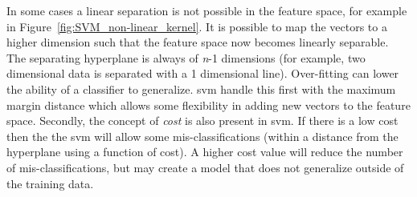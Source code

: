 In some cases a linear separation is not possible in the feature space, for example in Figure~\ref{fig:SVM_non-linear_kernel}. It is possible to map the vectors to a higher dimension such that the feature space now becomes linearly separable. The separating hyperplane is always of \emph{n}-1 dimensions (for example, two dimensional data is separated with a 1 dimensional line). Over-fitting can lower the ability of a classifier to generalize. \gls{svm} handle this first with the maximum margin distance which allows some flexibility in adding new vectors to the feature space. Secondly, the concept of \emph{cost} is also present in \gls{svm}. If there is a low cost then the the \gls{svm} will allow some mis-classifications (within a distance from the hyperplane using a function of cost). A higher cost value will reduce the number of mis-classifications, but may create a model that does not generalize outside of the training data.

